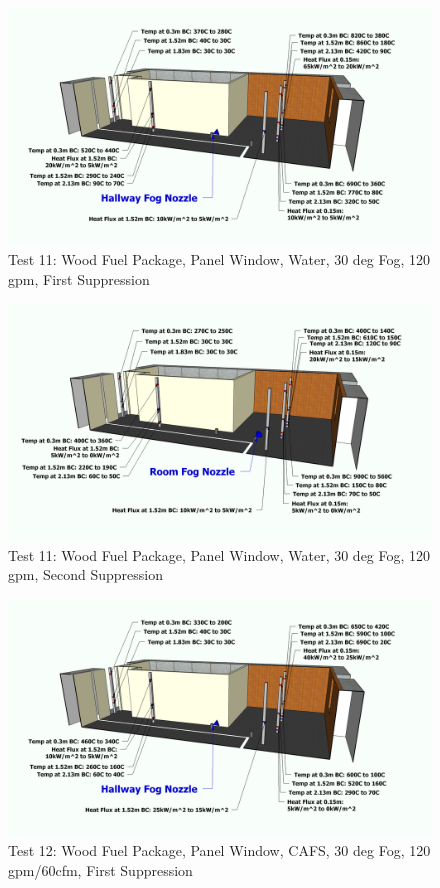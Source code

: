 \documentclass[12pt,oneside]{book}
\begin{document}
\begin{figure}[!ht]
	\includegraphics[width=6in]{../Figures/Pictures/Metric/DelCoFogTest11FirstSuppression}
	\caption{Test 11: Wood Fuel Package, Panel Window, Water, 30 deg Fog, 120 gpm, First Suppression}
	\label{fig:Test_11_First_Suppression}
\end{figure}

\begin{figure}[!ht]
	\includegraphics[width=6in]{../Figures/Pictures/Metric/DelCoFogTest11SecondSuppression}
	\caption{Test 11: Wood Fuel Package, Panel Window, Water, 30 deg Fog, 120 gpm, Second Suppression}
	\label{fig:Test_11_Second_Suppression}
\end{figure}

\begin{figure}[!ht]
	\includegraphics[width=6in]{../Figures/Pictures/Metric/DelCoFogTest12FirstSuppression}
	\caption{Test 12: Wood Fuel Package, Panel Window, CAFS, 30 deg Fog, 120 gpm/60cfm, First Suppression}
	\label{fig:Test_12_First_Suppression}
\end{figure}
\end{document}
